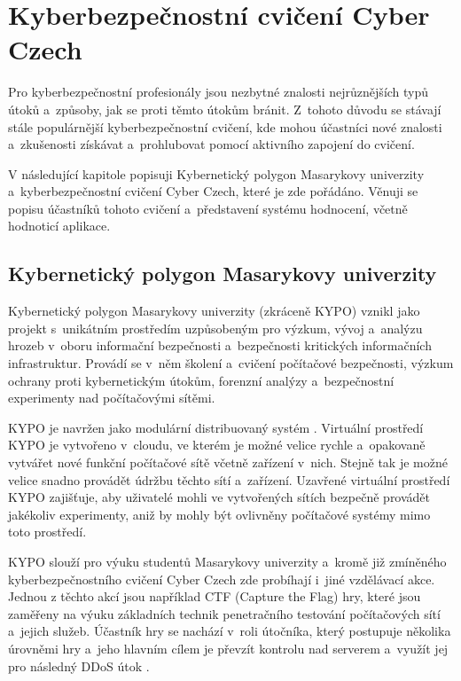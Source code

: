 \documentclass[
  digital,
  twoside,
  table, 
  nolof, 
  nolot
]{fithesis3}
\begin{document}
\chapter{Kyberbezpečnostní cvičení Cyber Czech}
\label{cyberex}

Pro kyberbezpečnostní profesionály jsou nezbytné znalosti nejrůznějších typů útoků a~způsoby, jak se proti těmto útokům bránit. Z~tohoto důvodu se stávají stále populárnější kyberbezpečnostní cvičení, kde mohou účastníci nové znalosti a~zkušenosti získávat a~prohlubovat pomocí aktivního zapojení do cvičení.

V následující kapitole popisuji Kybernetický polygon Masarykovy univerzity a~kyberbezpečnostní cvičení Cyber Czech, které je zde pořádáno. Věnuji se popisu účastníků tohoto cvičení a~představení systému hodnocení, včetně hodnoticí aplikace.

\section{Kybernetický polygon Masarykovy univerzity}

Kybernetický polygon Masarykovy univerzity (zkráceně KYPO) vznikl jako projekt s~unikátním prostředím uzpůsobeným pro výzkum, vývoj a~analýzu hrozeb v~oboru informační bezpečnosti a~bezpečnosti kritických informačních infrastruktur. Provádí se v~něm školení a~cvičení počítačové bezpečnosti, výzkum ochrany proti kybernetickým útokům, forenzní analýzy a~bezpečnostní experimenty nad počítačovými sítěmi.

KYPO je navržen jako modulární distribuovaný systém \cite{Vykopal2017KYPOCases}. Virtuální prostředí KYPO je vytvořeno v~cloudu, ve kterém je možné velice rychle a~opakovaně vytvářet nové funkční počítačové sítě včetně zařízení v~nich. Stejně tak je možné velice snadno provádět údržbu těchto sítí a~zařízení. Uzavřené virtuální prostředí KYPO zajišťuje, aby uživatelé mohli ve vytvořených sítích bezpečně provádět jakékoliv experimenty, aniž by mohly být ovlivněny počítačové systémy mimo toto prostředí.

KYPO slouží pro výuku studentů Masarykovy univerzity a~kromě již zmíněného kyberbezpečnostního cvičení Cyber Czech zde probíhají i~jiné vzdělávací akce. Jednou z těchto akcí jsou například CTF (Capture the Flag) hry, které jsou zaměřeny na výuku základních technik penetračního testování počítačových sítí a~jejich služeb. Účastník hry se nachází v~roli útočníka, který postupuje několika úrovněmi hry a~jeho hlavním cílem je převzít kontrolu nad serverem a~využít jej pro následný DDoS útok \cite{Vykopal2017KYPOCases}.
\end{document}
